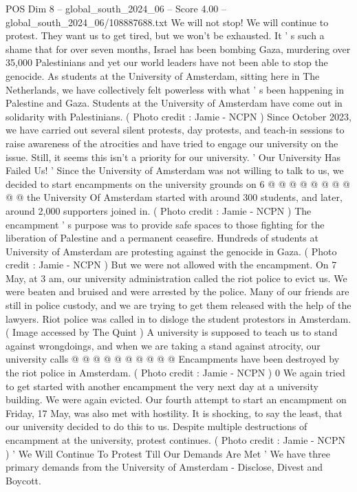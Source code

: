 \begin{textsample}{POS Dim 8 – global\_south\_2024\_06 – Score 4.00 – global\_south\_2024\_06/108887688.txt}  \label{ex:f8_pos_403}
We will not stop!
We will continue to protest.
They want us to get tired, but we won't be exhausted.
It ' s such a shame that for over seven months, Israel has been bombing Gaza, murdering over 35,000 Palestinians and yet our world leaders have not been able to stop the genocide.
As students at the University of Amsterdam, sitting here in The Netherlands, we have collectively felt powerless with what ' s been happening in Palestine and Gaza.
Students at the University of Amsterdam have come out in solidarity with Palestinians. ( Photo credit : Jamie - NCPN ) Since October 2023, we have carried out several silent protests, day protests, and teach-in sessions to raise awareness of the atrocities and have tried to engage our university on the issue.
Still, it seems this isn't a priority for our university. ' Our University Has Failed Us! ' Since the University of Amsterdam was not willing to talk to us, we decided to start encampments on the university grounds on 6 @ @ @ @ @ @ @ @ @ @ the University Of Amsterdam started with around 300 students, and later, around 2,000 supporters joined in. ( Photo credit : Jamie - NCPN ) The encampment ' s purpose was to provide safe spaces to those fighting for the liberation of Palestine and a permanent ceasefire.
Hundreds of students at University of Amsterdam are protesting against the genocide in Gaza. ( Photo credit : Jamie - NCPN ) But we were not allowed with the encampment.
On 7 May, at 3 am, our university administration called the riot police to evict us.
We were beaten and bruised and were arrested by the police.
Many of our friends are still in police custody, and we are trying to get them released with the help of the lawyers.
Riot police was called in to disloge the student protestors in Amsterdam. ( Image accessed by The Quint ) A university is supposed to teach us to stand against wrongdoings, and when we are taking a stand against atrocity, our university calls @ @ @ @ @ @ @ @ @ @ Encampments have been destroyed by the riot police in Amsterdam. ( Photo credit : Jamie - NCPN ) 0 We again tried to get started with another encampment the very next day at a university building.
We were again evicted.
Our fourth attempt to start an encampment on Friday, 17 May, was also met with hostility.
It is shocking, to say the least, that our university decided to do this to us.
Despite multiple destructions of encampment at the university, protest continues. ( Photo credit : Jamie - NCPN ) ' We Will Continue To Protest Till Our Demands Are Met ' We have three primary demands from the University of Amsterdam - Disclose, Divest and Boycott.

\end{textsample}
